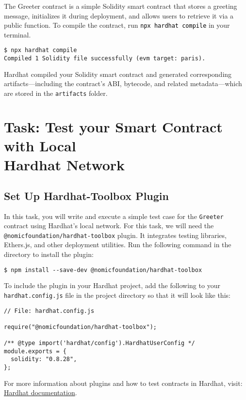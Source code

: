 \documentclass[12pt]{article}
\newcommand{\codeblack}[1]{%
  \texttt{\colorbox{black!7}{\textcolor{black}{#1}}}%
}
\begin{document}
The Greeter contract is a simple Solidity smart contract that stores a greeting message, initializes it during deployment, and allows users to retrieve it via a public function. To compile the contract, run \codeblack{npx hardhat compile} in your terminal.

\begin{verbatim}
$ npx hardhat compile
Compiled 1 Solidity file successfully (evm target: paris).
\end{verbatim}

Hardhat compiled your Solidity smart contract and generated corresponding artifacts—including the contract's ABI, bytecode, and related metadata—which are stored in the \texttt{artifacts} folder.

\section{Task: Test your Smart Contract with Local \\ Hardhat Network}

\subsection{Set Up Hardhat-Toolbox Plugin}
In this task, you will write and execute a simple test case for the \texttt{Greeter} contract using Hardhat's local network. For this task, we will need the \texttt{@nomicfoundation/hardhat-toolbox} plugin. It integrates testing libraries, Ethers.js, and other deployment utilities. Run the following command in the directory to install the plugin:

\begin{verbatim}
$ npm install --save-dev @nomicfoundation/hardhat-toolbox
\end{verbatim}

To include the plugin in your Hardhat project, add the following to your \texttt{hardhat.config.js} file in the project directory so that it will look like this:

\begin{verbatim}
// File: hardhat.config.js

require("@nomicfoundation/hardhat-toolbox");

/** @type import('hardhat/config').HardhatUserConfig */
module.exports = {
  solidity: "0.8.28",
};
\end{verbatim}
For more information about plugins and how to test contracts in Hardhat, visit: \\ \href{https://hardhat.org/tutorial/testing-contracts}{Hardhat documentation}.
\end{document}
